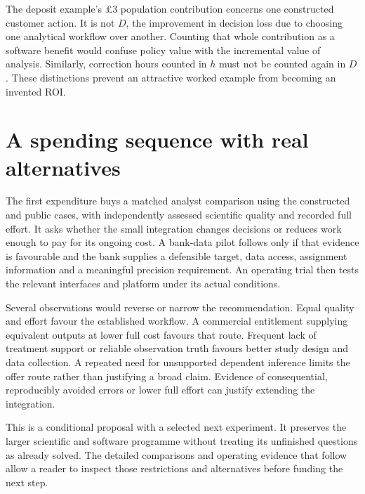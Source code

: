 The deposit example's \pounds3 population contribution concerns one
constructed customer action. It is not $D$, the improvement in decision
loss due to choosing one analytical workflow over another. Counting
that whole contribution as a software benefit would confuse policy value
with the incremental value of analysis. Similarly, correction hours
counted in $h$ must not be counted again in $D$. These distinctions
prevent an attractive worked example from becoming an invented ROI.

\section{A spending sequence with real alternatives}
The first expenditure buys a matched analyst comparison using the
constructed and public cases, with independently assessed scientific
quality and recorded full effort. It asks whether the small integration
changes decisions or reduces work enough to pay for its ongoing cost.
A bank-data pilot follows only if that evidence is favourable and the
bank supplies a defensible target, data access, assignment information
and a meaningful precision requirement. An operating trial then tests
the relevant interfaces and platform under its actual conditions.

Several observations would reverse or narrow the recommendation. Equal
quality and effort favour the established workflow. A commercial
entitlement supplying equivalent outputs at lower full cost favours
that route. Frequent lack of treatment support or reliable observation
truth favours better study design and data collection. A repeated
need for unsupported dependent inference limits the offer route rather
than justifying a broad claim. Evidence of consequential, reproducibly
avoided errors or lower full effort can justify extending the integration.

This is a conditional proposal with a selected next experiment. It
preserves the larger scientific and software programme without treating
its unfinished questions as already solved. The detailed comparisons
and operating evidence that follow allow a reader to inspect those
restrictions and alternatives before funding the next step.
